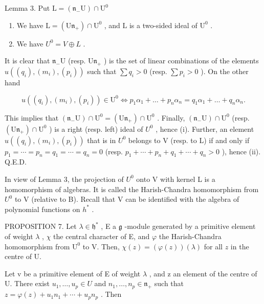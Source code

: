 Lemma 3. Put \(\mathrm{L} = (\mathfrak{n}_{-}\mathrm{U})\cap \mathrm{U}^{0}\)

\begin{enumerate}
\def\labelenumi{(\roman{enumi})}
\item
  We have \(\mathrm{L} = (\mathrm{U}\mathfrak{n}_{+})\cap \mathrm{U}^{0}\) , and \(\mathrm{L}\) is a two-sided ideal of \(\mathrm{U}^0\) .
\item
  We have \(U^{0} = V \oplus L\) .
\end{enumerate}

It is clear that \(\mathfrak{n}_{-}\mathrm{U}\) (resp. \(\mathrm{U}\mathfrak{n}_{+}\) ) is the set of linear combinations of the elements \(u((q_{i}),(m_{i}),(p_{i}))\) such that \(\sum q_{i}>0\) (resp. \(\sum p_{i}>0\) ). On the other hand

\[
u \left(\left(q _ {i}\right), \left(m _ {i}\right), \left(p _ {i}\right)\right) \in \mathrm{U} ^ {0} \Longleftrightarrow p _ {1} \alpha_ {1} + \dots + p _ {n} \alpha_ {n} = q _ {1} \alpha_ {1} + \dots + q _ {n} \alpha_ {n}.
\]

This implies that \((\mathfrak{n}_{-}\mathrm{U})\cap\mathrm{U}^{0}=(\mathrm{U}\mathfrak{n}_{+})\cap\mathrm{U}^{0}\) . Finally, \((\mathfrak{n}_{-}\mathrm{U})\cap\mathrm{U}^{0}\) (resp. \((\mathrm{U}\mathfrak{n}_{+})\cap\mathrm{U}^{0}\) ) is a right (resp. left) ideal of \(U^{0}\) , hence (i). Further, an element \(u((q_{i}),(m_{i}),(p_{i}))\) that is in \(U^{0}\) belongs to V (resp. to L) if and only if \(p_{1}=\cdots=p_{n}=q_{1}=\cdots=q_{n}=0\) (resp. \(p_{1}+\cdots+p_{n}+q_{1}+\cdots+q_{n}>0\) ), hence (ii). Q.E.D.

In view of Lemma 3, the projection of \(U^{0}\) onto V with kernel L is a homomorphism of algebras. It is called the Harish-Chandra homomorphism from \(U^{0}\) to V (relative to B). Recall that V can be identified with the algebra of polynomial functions on \(h^{*}\) .

PROPOSITION 7. Let \(\lambda \in \mathfrak{h}^*\) , E a \(\mathfrak{g}\) -module generated by a primitive element of weight \(\lambda\) , \(\chi\) the central character of E, and \(\varphi\) the Harish-Chandra homomorphism from \(\mathrm{U}^0\) to V. Then, \(\chi(z) = (\varphi(z))(\lambda)\) for all \(z\) in the centre of U.

Let v be a primitive element of E of weight \(\lambda\) , and z an element of the centre of U. There exist \(u_{1},\ldots,u_{p}\in U\) and \(n_{1},\ldots,n_{p}\in\mathfrak{n}_{+}\) such that \(z=\varphi(z)+u_{1}n_{1}+\cdots+u_{p}n_{p}\) . Then

